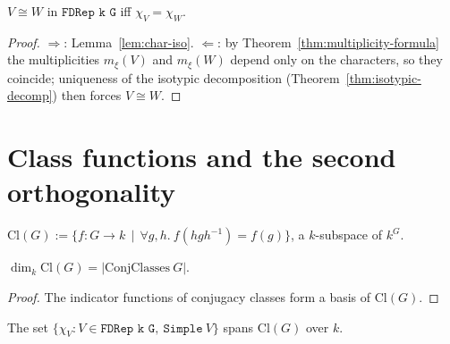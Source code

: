 \begin{corollary}
  \label{cor:char-separates}
  \leanok
  $V \cong W$ in $\texttt{FDRep k G}$ iff $\chi_V = \chi_W$.
\end{corollary}

\begin{proof}
  $\Rightarrow$: Lemma~\ref{lem:char-iso}. $\Leftarrow$: by
  Theorem~\ref{thm:multiplicity-formula} the multiplicities $m_\xi(V)$ and
  $m_\xi(W)$ depend only on the characters, so they coincide; uniqueness of
  the isotypic decomposition (Theorem~\ref{thm:isotypic-decomp}) then forces
  $V \cong W$.
\end{proof}

\section{Class functions and the second orthogonality}

\begin{definition}
  \label{def:cl-G}
  \leanok
  $\mathrm{Cl}(G) := \{f : G \to k \,\mid\, \forall g, h.\ f(hgh^{-1}) = f(g)\}$,
  a $k$-subspace of $k^G$.
\end{definition}

\begin{lemma}[$\dim \mathrm{Cl}(G) = $ \#conjugacy classes]
  \label{lem:dim-cl}
  \leanok
  $\dim_k \mathrm{Cl}(G) = |\mathrm{ConjClasses}\ G|$.
\end{lemma}

\begin{proof}\leanok
  The indicator functions of conjugacy classes form a basis of
  $\mathrm{Cl}(G)$.
\end{proof}

\begin{theorem}
  \label{thm:char-span}
  The set $\{\chi_V : V \in \texttt{FDRep k G},\ \texttt{Simple}\ V\}$ spans
  $\mathrm{Cl}(G)$ over $k$.
\end{theorem}

